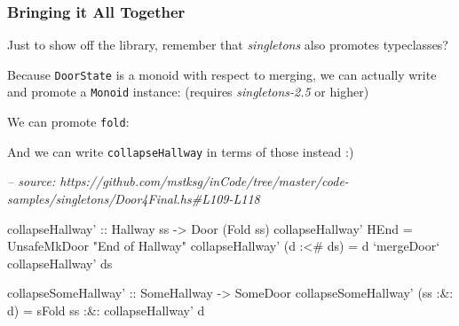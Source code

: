 \documentclass[]{article}
\newenvironment{Shaded}{}{}
\newcommand{\CommentTok}[1]{\textcolor[rgb]{0.38,0.63,0.69}{\textit{#1}}}
\newcommand{\DataTypeTok}[1]{\textcolor[rgb]{0.56,0.13,0.00}{#1}}
\newcommand{\FunctionTok}[1]{\textcolor[rgb]{0.02,0.16,0.49}{#1}}
\newcommand{\NormalTok}[1]{#1}
\newcommand{\OtherTok}[1]{\textcolor[rgb]{0.00,0.44,0.13}{#1}}
\newcommand{\StringTok}[1]{\textcolor[rgb]{0.25,0.44,0.63}{#1}}
\begin{document}
\hypertarget{bringing-it-all-together}{%
\subsubsection{Bringing it All Together}\label{bringing-it-all-together}}

Just to show off the library, remember that \emph{singletons} also promotes
typeclasses?

Because \texttt{DoorState} is a monoid with respect to merging, we can actually
write and promote a \texttt{Monoid} instance: (requires \emph{singletons-2.5} or
higher)

\begin{Shaded}
\end{Shaded}

We can promote \texttt{fold}:

\begin{Shaded}
\end{Shaded}

And we can write \texttt{collapseHallway} in terms of those instead :)

\begin{Shaded}
\begin{Highlighting}[]
\CommentTok{-- source: https://github.com/mstksg/inCode/tree/master/code-samples/singletons/Door4Final.hs#L109-L118}

\NormalTok{collapseHallway'}
\OtherTok{    ::} \DataTypeTok{Hallway}\NormalTok{ ss}
    \OtherTok{->} \DataTypeTok{Door}\NormalTok{ (}\DataTypeTok{Fold}\NormalTok{ ss)}
\NormalTok{collapseHallway' }\DataTypeTok{HEnd}       \FunctionTok{=} \DataTypeTok{UnsafeMkDoor} \StringTok{"End of Hallway"}
\NormalTok{collapseHallway' (d }\FunctionTok{:<#}\NormalTok{ ds) }\FunctionTok{=}\NormalTok{ d }\OtherTok{`mergeDoor`}\NormalTok{ collapseHallway' ds}

\OtherTok{collapseSomeHallway' ::} \DataTypeTok{SomeHallway} \OtherTok{->} \DataTypeTok{SomeDoor}
\NormalTok{collapseSomeHallway' (ss }\FunctionTok{:&:}\NormalTok{ d) }\FunctionTok{=}
\NormalTok{        sFold ss}
    \FunctionTok{:&:}\NormalTok{ collapseHallway' d}
\end{Highlighting}
\end{Shaded}
\end{document}

